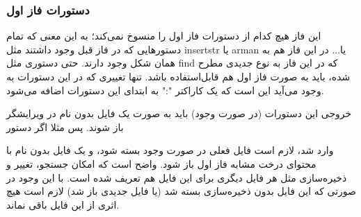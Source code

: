 \subsubsection*{{\titr دستورات فاز اول}}


این فاز هیچ کدام از دستورات فاز اول را منسوخ نمی‌کند؛ به این معنی که تمام دستورهایی که در فاز قبل وجود داشتند مثل insertstr یا arman یا... در این فاز هم به همان شکل وجود دارند. حتی دستوری مثل find که در این فاز به نوع جدیدی مطرح شده، باید به صورت فاز اول هم قابل‌استفاده باشد.
تنها تغییری که در این دستورات به وجود می‌آید این است که یک کاراکتر ":" به ابتدای این دستورات اضافه می‌شود.


خروجی این دستورات (در صورت وجود) باید به صورت یک فایل بدون نام در ویرایشگر باز شوند. پس مثلا اگر دستور


وارد شد، لازم است فایل فعلی در صورت وجود بسته شود، و یک فایل بدون نام با محتوای درخت مشابه فاز اول باز شود. واضح است که امکان جستجو، تغییر و ذخیره‌سازی مثل هر فایل دیگری برای این فایل هم تعریف شده است. با این وجود در صورتی که این فایل بدون ذخیره‌سازی بسته شد (یا فایل جدیدی باز شد) لازم است هیچ اثری از این فایل باقی نماند.
